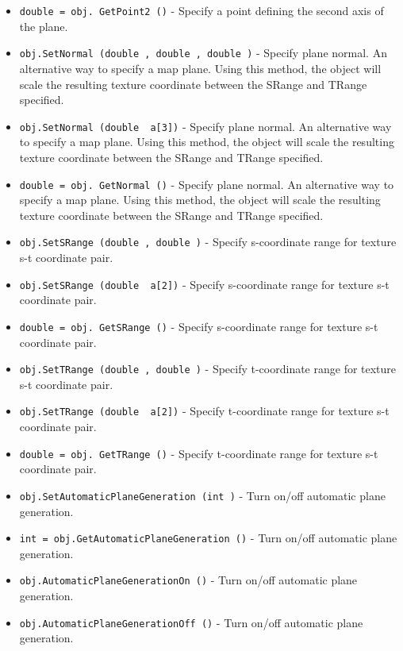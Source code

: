 \begin{itemize}
\item  \verb|double = obj. GetPoint2 ()| -  Specify a point defining the second axis of the plane.

\item  \verb|obj.SetNormal (double , double , double )| -  Specify plane normal. An alternative way to specify a map plane. Using
 this method, the object will scale the resulting texture coordinate
 between the SRange and TRange specified.

\item  \verb|obj.SetNormal (double  a[3])| -  Specify plane normal. An alternative way to specify a map plane. Using
 this method, the object will scale the resulting texture coordinate
 between the SRange and TRange specified.

\item  \verb|double = obj. GetNormal ()| -  Specify plane normal. An alternative way to specify a map plane. Using
 this method, the object will scale the resulting texture coordinate
 between the SRange and TRange specified.

\item  \verb|obj.SetSRange (double , double )| -  Specify s-coordinate range for texture s-t coordinate pair.

\item  \verb|obj.SetSRange (double  a[2])| -  Specify s-coordinate range for texture s-t coordinate pair.

\item  \verb|double = obj. GetSRange ()| -  Specify s-coordinate range for texture s-t coordinate pair.

\item  \verb|obj.SetTRange (double , double )| -  Specify t-coordinate range for texture s-t coordinate pair.

\item  \verb|obj.SetTRange (double  a[2])| -  Specify t-coordinate range for texture s-t coordinate pair.

\item  \verb|double = obj. GetTRange ()| -  Specify t-coordinate range for texture s-t coordinate pair.

\item  \verb|obj.SetAutomaticPlaneGeneration (int )| -  Turn on/off automatic plane generation.

\item  \verb|int = obj.GetAutomaticPlaneGeneration ()| -  Turn on/off automatic plane generation.

\item  \verb|obj.AutomaticPlaneGenerationOn ()| -  Turn on/off automatic plane generation.

\item  \verb|obj.AutomaticPlaneGenerationOff ()| -  Turn on/off automatic plane generation.

\end{itemize}
